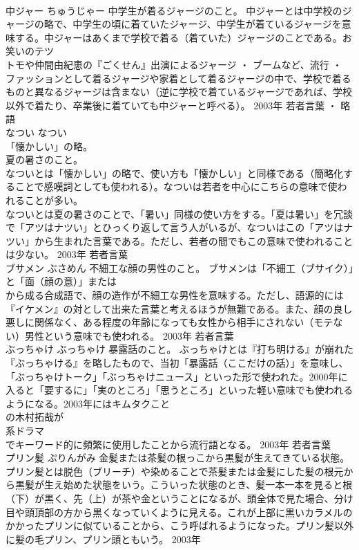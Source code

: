 \documentclass[8pt]{extreport}
\begin{document}
\begin{CJK}{UTF8}{min}
\\	中ジャー	ちゅうじゃー	中学生が着るジャージのこと。	中ジャーとは中学校のジャージの略で、中学生の頃に着ていたジャージ、中学生が着ているジャージを意味する。中ジャーはあくまで学校で着る（着ていた）ジャージのことである。お笑いのテツ
\\	トモや仲間由紀恵の『ごくせん』出演によるジャージ ・ ブームなど、流行 ・ ファッションとして着るジャージや家着として着るジャージの中で、学校で着るものと異なるジャージは含まない（逆に学校で着ているジャージであれば、学校以外で着たり、卒業後に着ていても中ジャーと呼べる）。	2003年	若者言葉 ・ 略語	
\\	なつい	なつい	
\\	「懐かしい」の略。 
\\	夏の暑さのこと。	
\\	なついとは「懐かしい」の略で、使い方も「懐かしい」と同様である（簡略化することで感嘆詞としても使われる）。なついは若者を中心にこちらの意味で使われることが多い。 
\\	なついとは夏の暑さのことで、「暑い」同様の使い方をする。「夏は暑い」を冗談で「アツはナツい」とひっくり返して言う人がいるが、なついはこの「アツはナツい」から生まれた言葉である。ただし、若者の間でもこの意味で使われることは少ない。	2003年	若者言葉	
\\	ブサメン	ぶさめん	不細工な顔の男性のこと。	ブサメンは「不細工（ブサイク）」と「面（顔の意）」または
\\	から成る合成語で、顔の造作が不細工な男性を意味する。ただし、語源的には『イケメン』の対として出来た言葉と考えるほうが無難である。また、顔の良し悪しに関係なく、ある程度の年齢になっても女性から相手にされない（モテない）男性という意味でも使われる。	2003年	若者言葉	
\\	ぶっちゃけ	ぶっちゃけ	暴露話のこと。	ぶっちゃけとは『打ち明ける』が崩れた『ぶっちゃける』を略したもので、当初「暴露話（ここだけの話）」を意味し、「ぶっちゃけトーク」「ぶっちゃけニュース」といった形で使われた。2000年に入ると「要するに」「実のところ」「思うところ」といった軽い意味でも使われるようになる。2003年にはキムタクこと
\\	の木村拓哉が
\\	系ドラマ
\\	でキーワード的に頻繁に使用したことから流行語となる。	2003年	若者言葉	
\\	プリン髪	ぷりんがみ	金髪または茶髪の根っこから黒髪が生えてきている状態。	プリン髪とは脱色（ブリーチ）や染めることで茶髪または金髪にした髪の根元から黒髪が生え始めた状態をいう。こういった状態のとき、髪一本一本を見ると根（下）が黒く、先（上）が茶や金ということになるが、頭全体で見た場合、分け目や頭頂部の方から黒くなっていくように見える。これが上部に黒いカラメルのかかったプリンに似ていることから、こう呼ばれるようになった。プリン髪以外に髪の毛プリン、プリン頭ともいう。	2003年	

\end{CJK}
\end{document}
